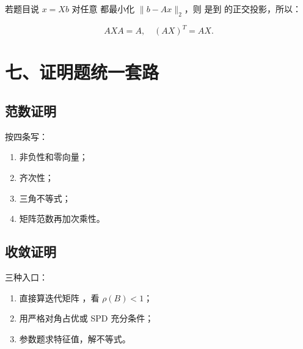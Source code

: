 \documentclass[11pt,a4paper]{ctexart}
\newcommand{\code}[1]{\begingroup\ttfamily\small #1\endgroup}
\begin{document}
若题目说 $x=Xb$ 对任意 \code{} 都最小化 $\|b-Ax\|_2$，则 \code{} 是到 \code{} 的正交投影，所以：

\[
AXA=A,\quad (AX)^T=AX.
\]


\section*{七、证明题统一套路}



\subsection*{范数证明}


按四条写：

\begin{enumerate}

\item 非负性和零向量；

\item 齐次性；

\item 三角不等式；

\item 矩阵范数再加次乘性。

\end{enumerate}


\subsection*{收敛证明}


三种入口：

\begin{enumerate}

\item 直接算迭代矩阵 \code{}，看 $\rho(B)<1$；

\item 用严格对角占优或 SPD 充分条件；

\item 参数题求特征值，解不等式。

\end{enumerate}
\end{document}

